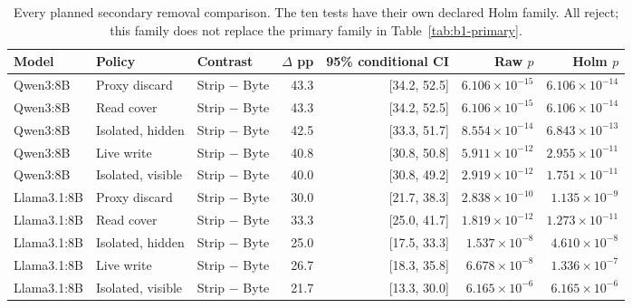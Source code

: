 \begin{table}[t]\centering\small
\caption{Every planned secondary removal comparison. The ten tests have their own declared Holm family. All reject; this family does not replace the primary family in Table~\ref{tab:b1-primary}.}\label{tab:b1-removal}
\setlength{\tabcolsep}{4pt}
\begin{tabularx}{\textwidth}{@{}lP{.12\textwidth}Yrrrr@{}}\toprule
Model & Policy & Contrast & $\Delta$ pp & 95\% conditional CI & Raw $p$ & Holm $p$ \\\midrule
Qwen3:8B & Proxy discard & Strip $-$ Byte & 43.3 & [34.2, 52.5] & $6.106\times10^{-15}$ & $6.106\times10^{-14}$ \\
Qwen3:8B & Read cover & Strip $-$ Byte & 43.3 & [34.2, 52.5] & $6.106\times10^{-15}$ & $6.106\times10^{-14}$ \\
Qwen3:8B & Isolated, hidden & Strip $-$ Byte & 42.5 & [33.3, 51.7] & $8.554\times10^{-14}$ & $6.843\times10^{-13}$ \\
Qwen3:8B & Live write & Strip $-$ Byte & 40.8 & [30.8, 50.8] & $5.911\times10^{-12}$ & $2.955\times10^{-11}$ \\
Qwen3:8B & Isolated, visible & Strip $-$ Byte & 40.0 & [30.8, 49.2] & $2.919\times10^{-12}$ & $1.751\times10^{-11}$ \\
Llama3.1:8B & Proxy discard & Strip $-$ Byte & 30.0 & [21.7, 38.3] & $2.838\times10^{-10}$ & $1.135\times10^{-9}$ \\
Llama3.1:8B & Read cover & Strip $-$ Byte & 33.3 & [25.0, 41.7] & $1.819\times10^{-12}$ & $1.273\times10^{-11}$ \\
Llama3.1:8B & Isolated, hidden & Strip $-$ Byte & 25.0 & [17.5, 33.3] & $1.537\times10^{-8}$ & $4.610\times10^{-8}$ \\
Llama3.1:8B & Live write & Strip $-$ Byte & 26.7 & [18.3, 35.8] & $6.678\times10^{-8}$ & $1.336\times10^{-7}$ \\
Llama3.1:8B & Isolated, visible & Strip $-$ Byte & 21.7 & [13.3, 30.0] & $6.165\times10^{-6}$ & $6.165\times10^{-6}$ \\
\bottomrule\end{tabularx}\end{table}
